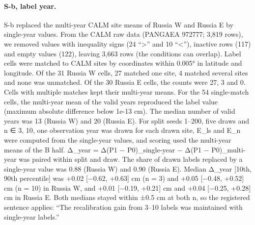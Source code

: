 \paragraph*{S-b, label year.} S-b replaced the multi-year CALM site means of Russia W and Russia E by single-year values. From the CALM raw data (PANGAEA 972777; 3,819 rows), we removed values with inequality signs (24 ``>'' and 10 ``<''), inactive rows (117) and empty values (122), leaving 3,663 rows (the conditions can overlap). Label cells were matched to CALM sites by coordinates within 0.005° in latitude and longitude. Of the 31 Russia W cells, 27 matched one site, 4 matched several sites and none was unmatched. Of the 30 Russia E cells, the counts were 27, 3 and 0. Cells with multiple matches kept their multi-year means. For the 54 single-match cells, the multi-year mean of the valid years reproduced the label value (maximum absolute difference below 1e-13 cm). The median number of valid years was 13 (Russia W) and 20 (Russia E). For split seeds 1–200, five draws and n ∈ {3, 10}, one observation year was drawn for each drawn site, E\_ls and E\_n were computed from the single-year values, and scoring used the multi-year means of the B half. Δ\_year = Δ(P1 − P0)\_single-year − Δ(P1 − P0)\_multi-year was paired within split and draw. The share of drawn labels replaced by a single-year value was 0.88 (Russia W) and 0.90 (Russia E). Median Δ\_year [10th, 90th percentile] was +0.02 [−0.62, +0.63] cm (n = 3) and +0.05 [−0.48, +0.52] cm (n = 10) in Russia W, and +0.01 [−0.19, +0.21] cm and +0.04 [−0.25, +0.28] cm in Russia E. Both medians stayed within ±0.5 cm at both n, so the registered sentence applies: ``The recalibration gain from 3–10 labels was maintained with single-year labels.''

